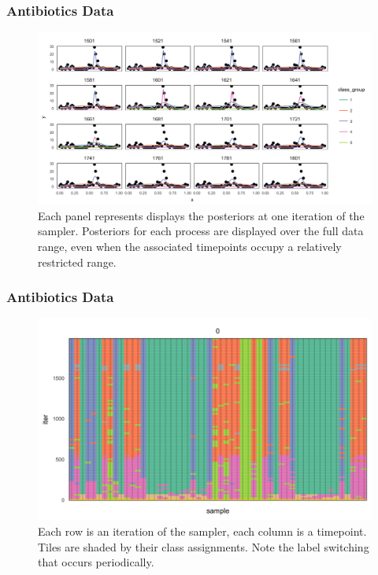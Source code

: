 \documentclass{beamer}
\begin{document}
\begin{frame}
  \frametitle{Antibiotics Data}
\begin{figure}[ht]
  \centering
  \includegraphics[width=\textwidth]{figure/abt_fits}
  \caption{Each panel represents displays the posteriors at one
    iteration of the sampler. Posteriors for each process are displayed over the
    full data range, even when the associated timepoints occupy a relatively
    restricted range. \label{fig:abt_fits}}
\end{figure}

\begin{frame}
  \frametitle{Antibiotics Data}
\begin{figure}[ht]
  \centering
  \includegraphics[width=\textwidth]{figure/abt_states}
  \caption{Each row is an iteration of the sampler, each column is a timepoint.
    Tiles are shaded by their class assignments. Note the label switching that
    occurs periodically. \label{fig:abt_states} }
\end{figure}


\end{frame}
\end{frame}
\end{document}
